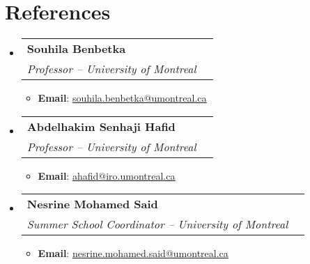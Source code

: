 \documentclass[letterpaper,11pt]{article}
\makeatletter
\newcommand{\resumeItem}[1]{
  \item\small{
    {#1 \vspace{-2pt}}
  }
}
\newcommand{\resumeSubheading}[4]{
  \vspace{-2pt}\item
    \begin{tabular*}{0.97\textwidth}[t]{l@{\extracolsep{\fill}}r}
      \textbf{#1} & #2 \\
      \textit{\small#3} & \textit{\small #4} \\
    \end{tabular*}\vspace{-7pt}
}
\newcommand{\resumeItemListStart}{\begin{itemize}}
\newcommand{\resumeItemListEnd}{\end{itemize}\vspace{-5pt}}
\makeatother
\begin{document}
\section{References}
 \begin{itemize}[leftmargin=0.15in, label={}]
     \resumeSubheading
         {Souhila Benbetka}{}{Professor -- University of Montreal}{}
         \resumeItemListStart
             \resumeItem{\textbf{Email}: \href{mailto:souhila.benbetka@umontreal.ca}{\underline{souhila.benbetka@umontreal.ca}}}
         \resumeItemListEnd
         
     \resumeSubheading
         {Abdelhakim Senhaji Hafid}{}{Professor -- University of Montreal}{}
         \resumeItemListStart
             \resumeItem{\textbf{Email}: \href{mailto:ahafid@iro.umontreal.ca}{\underline{ahafid@iro.umontreal.ca}}}
         \resumeItemListEnd
         
     \resumeSubheading
         {Nesrine Mohamed Said}{}{Summer School Coordinator -- University of Montreal}{}
         \resumeItemListStart
             \resumeItem{\textbf{Email}: \href{mailto:nesrine.mohamed.said@umontreal.ca}{\underline{nesrine.mohamed.said@umontreal.ca}}}
         \resumeItemListEnd
 \end{itemize}



\end{document}
